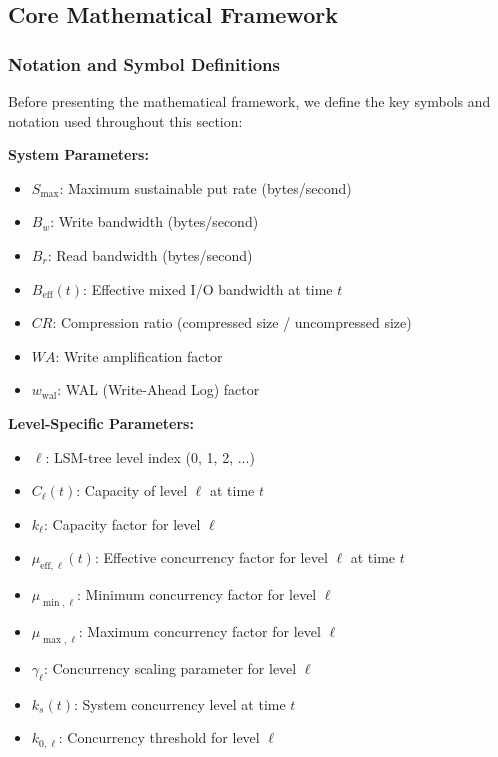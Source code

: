 \documentclass[11pt]{article}
\begin{document}
\subsection{Core Mathematical Framework}

\subsubsection{Notation and Symbol Definitions}
Before presenting the mathematical framework, we define the key symbols and notation used throughout this section:

\textbf{System Parameters:}
\begin{itemize}
    \item $S_{\text{max}}$: Maximum sustainable put rate (bytes/second)
    \item $B_w$: Write bandwidth (bytes/second)
    \item $B_r$: Read bandwidth (bytes/second)
    \item $B_{\text{eff}}(t)$: Effective mixed I/O bandwidth at time $t$
    \item $CR$: Compression ratio (compressed size / uncompressed size)
    \item $WA$: Write amplification factor
    \item $w_{\text{wal}}$: WAL (Write-Ahead Log) factor
\end{itemize}

\textbf{Level-Specific Parameters:}
\begin{itemize}
    \item $\ell$: LSM-tree level index (0, 1, 2, ...)
    \item $C_\ell(t)$: Capacity of level $\ell$ at time $t$
    \item $k_\ell$: Capacity factor for level $\ell$
    \item $\mu_{\text{eff},\ell}(t)$: Effective concurrency factor for level $\ell$ at time $t$
    \item $\mu_{\min,\ell}$: Minimum concurrency factor for level $\ell$
    \item $\mu_{\max,\ell}$: Maximum concurrency factor for level $\ell$
    \item $\gamma_\ell$: Concurrency scaling parameter for level $\ell$
    \item $k_s(t)$: System concurrency level at time $t$
    \item $k_{0,\ell}$: Concurrency threshold for level $\ell$
\end{itemize}
\end{document}

